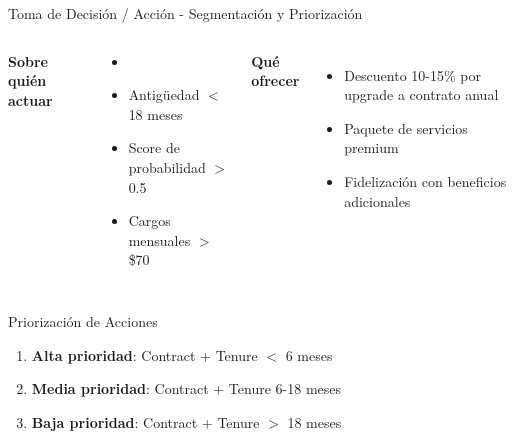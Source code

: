 \begin{frame}{Toma de Decisión / Acción - Segmentación y Priorización}
    \begin{columns}[t]
        \textbf{Sobre quién actuar}
        \begin{itemize}
            \item {}
            \item Antigüedad $<$ 18 meses
            \item Score de probabilidad $>$ 0.5
            \item Cargos mensuales $>$ \$70
        \end{itemize}
        
        \textbf{Qué ofrecer}
        \begin{itemize}
            \item Descuento 10-15\% por upgrade a contrato anual
            \item Paquete de servicios premium
            \item Fidelización con beneficios adicionales
        \end{itemize}
    \end{columns}
    
    \vsp
    \begin{block}{Priorización de Acciones}
        \begin{enumerate}
            \item \textbf{Alta prioridad}: Contract + Tenure $<$ 6 meses
            \item \textbf{Media prioridad}: Contract + Tenure 6-18 meses
            \item \textbf{Baja prioridad}: Contract + Tenure $>$ 18 meses
        \end{enumerate}
    \end{block}
\end{frame}

